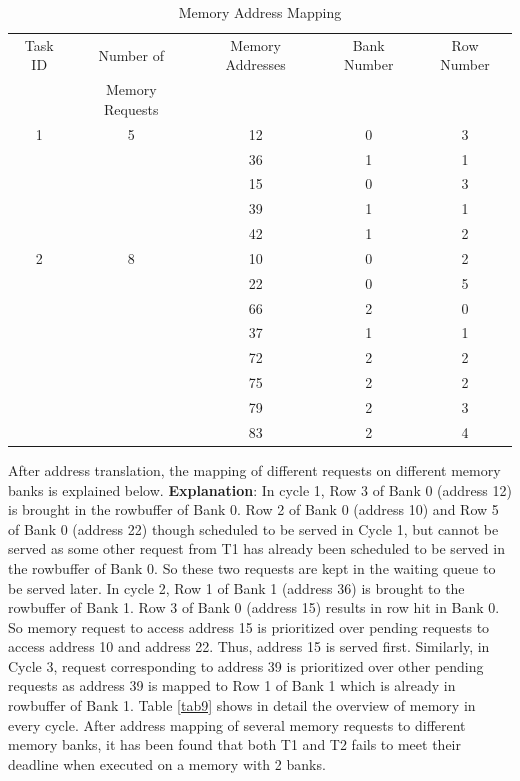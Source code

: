\begin{table}[t]
 \begin{tabular}{|c|c|c|c|c|}\hline
 Task ID & Number of & Memory Addresses & Bank Number & Row Number\\ 
         & Memory Requests &            &             &            \\ \hline
 1 & 5 & 12 & 0 & 3 \\
   &   & 36 & 1 & 1 \\
   &   & 15 & 0 & 3 \\
   &   & 39 & 1 & 1 \\
   &   & 42 & 1 & 2 \\ \hline
 2 & 8 & 10 & 0 & 2 \\
   &   & 22 & 0 & 5 \\
   &   & 66 & 2 & 0 \\
   &   & 37 & 1 & 1 \\
   &   & 72 & 2 & 2 \\
   &   & 75 & 2 & 2 \\
   &   & 79 & 2 & 3 \\
   &   & 83 & 2 & 4 \\ \hline   
 \end{tabular}
\caption{Memory Address Mapping}
\label{tab8}
\end{table}

After address translation, the mapping of different requests on different memory banks is explained below.
\newline
\newline
{\bf Explanation}: In cycle 1, Row 3 of Bank 0 (address 12) is brought in the rowbuffer of Bank 0. Row 2 of Bank 0
 (address 10) and Row 5 of Bank 0 (address 22) though scheduled to be served in Cycle 1, but cannot be served as some other
 request from T1 has already been scheduled to be served in the rowbuffer of Bank 0. So these two requests are kept in the 
 waiting queue to be served later. 
\newline
\newline
In cycle 2,  Row 1 of Bank 1 (address 36) is brought to the rowbuffer of Bank 1. Row 3 of Bank 0 (address 15) results in row 
hit in Bank 0. So memory request to access address 15 is prioritized over pending requests to access address 10 and address 22.
Thus, address 15 is served first. Similarly, in Cycle 3, request corresponding to address 39 is prioritized over other 
pending requests as address 39 is mapped to Row 1 of Bank 1 which is already in rowbuffer of Bank 1. 
\newline
\newline
Table \ref{tab9} shows in detail the overview of memory in every cycle. After address mapping of several memory requests to 
different memory banks, it has been found that both T1 and T2 fails to meet their deadline when executed on a memory with 
2 banks.

